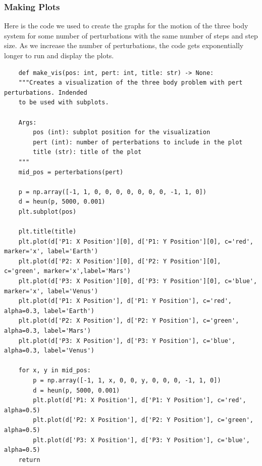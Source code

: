 \documentclass{article}
\begin{document}
\subsubsection{Making Plots}
Here is the code we used to create the graphs for the motion of the three body system for some number of perturbations with the same number of steps and step size. As we increase the number of perturbations, the code gets exponentially longer to run and display the plots. 
\begin{verbatim}
    def make_vis(pos: int, pert: int, title: str) -> None:
    """Creates a visualization of the three body problem with pert perturbations. Indended 
    to be used with subplots.

    Args:
        pos (int): subplot position for the visualization
        pert (int): number of perterbations to include in the plot
        title (str): title of the plot
    """
    mid_pos = perterbations(pert)

    p = np.array([-1, 1, 0, 0, 0, 0, 0, 0, 0, -1, 1, 0])
    d = heun(p, 5000, 0.001)
    plt.subplot(pos)

    plt.title(title)
    plt.plot(d['P1: X Position'][0], d['P1: Y Position'][0], c='red', marker='x', label='Earth')
    plt.plot(d['P2: X Position'][0], d['P2: Y Position'][0], c='green', marker='x',label='Mars')
    plt.plot(d['P3: X Position'][0], d['P3: Y Position'][0], c='blue', marker='x', label='Venus')
    plt.plot(d['P1: X Position'], d['P1: Y Position'], c='red', alpha=0.3, label='Earth')
    plt.plot(d['P2: X Position'], d['P2: Y Position'], c='green', alpha=0.3, label='Mars')
    plt.plot(d['P3: X Position'], d['P3: Y Position'], c='blue', alpha=0.3, label='Venus')

    for x, y in mid_pos:
        p = np.array([-1, 1, x, 0, 0, y, 0, 0, 0, -1, 1, 0])
        d = heun(p, 5000, 0.001)        
        plt.plot(d['P1: X Position'], d['P1: Y Position'], c='red', alpha=0.5)
        plt.plot(d['P2: X Position'], d['P2: Y Position'], c='green', alpha=0.5)
        plt.plot(d['P3: X Position'], d['P3: Y Position'], c='blue', alpha=0.5)
    return
\end{verbatim}
\end{document}
